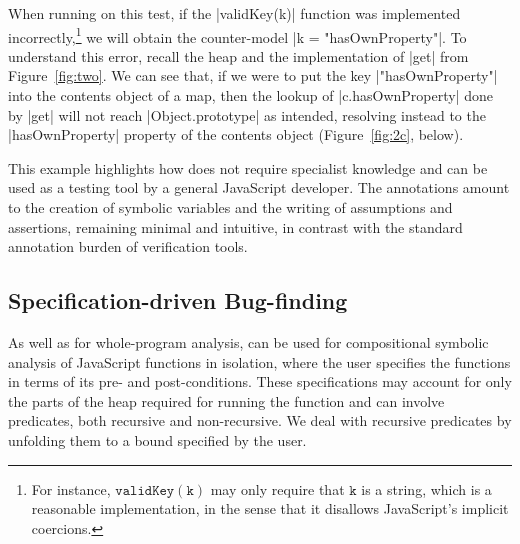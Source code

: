 % 
When running \cosette on this test, if the \jsinline|validKey(k)| function was implemented incorrectly,\footnote{For instance, $\mathtt{validKey(k)}$ may only require that $\mathtt{k}$ is a string, which is a reasonable implementation, in the sense that it disallows JavaScript's implicit coercions.}
we will obtain the counter-model \jsinline|k = "hasOwnProperty"|. To understand this error, recall the heap and the implementation of \jsinline|get| from Figure~\ref{fig:two}. We can see that, if we were to put the key \jsinline|"hasOwnProperty"| into the contents object of a map, then the lookup of \jsinline|c.hasOwnProperty| done by \jsinline|get| will not reach \jsinline|Object.prototype| as intended, resolving instead to the \jsinline|hasOwnProperty| property of the contents object (Figure~\ref{fig:2c}, below).

This example highlights how \cosette does not require specialist knowledge and can 
be used as a testing tool by a general JavaScript developer. The annotations amount to the creation of 
symbolic variables and the writing of assumptions and assertions, remaining minimal and intuitive, in contrast with the standard annotation burden of verification tools.

\vspace*{-0.2cm}
\subsection{Specification-driven Bug-finding}
\label{subsec:sdbf}


As well as for whole-program analysis, \cosette can be used for compositional symbolic analysis of JavaScript functions in isolation, where the user specifies the functions in terms of its pre- and post-conditions. These specifications may account for only the parts of the heap required for running the function and can involve predicates, both recursive and non-recursive. We deal with recursive predicates by unfolding them to a  bound specified by the user.


